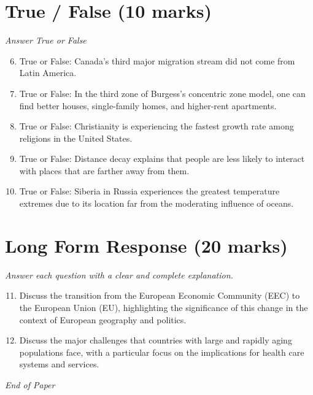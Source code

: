 \documentclass[12pt]{article}
\begin{document}
\section*{True / False (10 marks)}
\textit{Answer True or False}
\begin{enumerate}[label=\arabic*.]
\setcounter{enumi}{5}
\item True or False: Canada's third major migration stream did not come from Latin America.
\item True or False: In the third zone of Burgess's concentric zone model, one can find better houses, single-family homes, and higher-rent apartments.
\item True or False: Christianity is experiencing the fastest growth rate among religions in the United States.
\item True or False: Distance decay explains that people are less likely to interact with places that are farther away from them.
\item True or False: Siberia in Russia experiences the greatest temperature extremes due to its location far from the moderating influence of oceans.
\end{enumerate}

\section*{Long Form Response (20 marks)}
\textit{Answer each question with a clear and complete explanation.}
\begin{enumerate}[label=\arabic*.]
\setcounter{enumi}{10}
\item Discuss the transition from the European Economic Community (EEC) to the European Union (EU), highlighting the significance of this change in the context of European geography and politics.
\item Discuss the major challenges that countries with large and rapidly aging populations face, with a particular focus on the implications for health care systems and services.
\end{enumerate}

\vfill
\noindent\textit{End of Paper}
\end{document}
